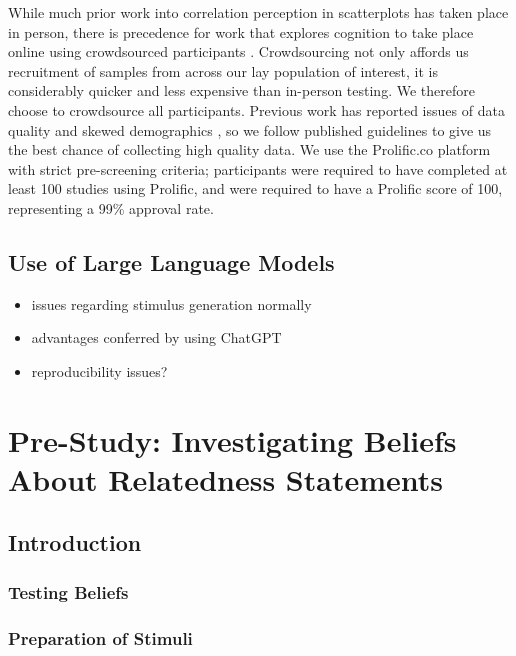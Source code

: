 \documentclass[manuscript,screen,review]{acmart}
\providecommand{\tightlist}{%
  \setlength{\itemsep}{0pt}\setlength{\parskip}{0pt}}\usepackage{longtable,booktabs,array}
\begin{document}
While much prior work into correlation perception in scatterplots has
taken place in person, there is precedence for work that explores
cognition to take place online using crowdsourced participants
\citep{xiong_2022}. Crowdsourcing not only affords us recruitment of
samples from across our lay population of interest, it is considerably
quicker and less expensive than in-person testing. We therefore choose
to crowdsource all participants. Previous work has reported issues of
data quality and skewed demographics
\citep{chmielewski_2020, charalambides_2021, peer_2021}, so we follow
published guidelines \citep{peer_2021} to give us the best chance of
collecting high quality data. We use the Prolific.co platform
\citep{prolific} with strict pre-screening criteria; participants were
required to have completed at least 100 studies using Prolific, and were
required to have a Prolific score of 100, representing a 99\% approval
rate.

\subsection{Use of Large Language
Models}\label{use-of-large-language-models}

\begin{itemize}
\tightlist
\item
  issues regarding stimulus generation normally
\item
  advantages conferred by using ChatGPT
\item
  reproducibility issues?
\end{itemize}

\section{Pre-Study: Investigating Beliefs About Relatedness
Statements}\label{sec-pre-study}

\subsection{Introduction}\label{sec-pre-study-intro}

\subsubsection{Testing Beliefs}\label{sec-testing-beliefs}

\subsubsection{Preparation of Stimuli}\label{sec-stim-prep-pre}
\end{document}
